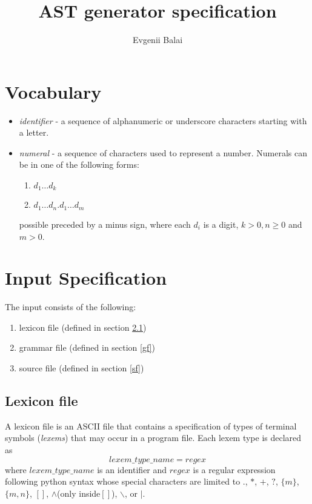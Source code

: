 \documentclass[a4paper,10pt]{article}
\title{AST generator specification}
\author{Evgenii Balai}
\def\st{\noindent}
\begin{document}
\maketitle
\st

\tableofcontents
\section{Vocabulary}

\begin{itemize}
\item \textit{identifier} -  a sequence of alphanumeric or underscore characters starting with a letter.
\item \textit{numeral} - a sequence of characters used to represent a number. Numerals can be in one of the following forms:
\begin{enumerate}
\item $d_1\ldots d_k$
\item $d_1\ldots d_n.d_1\ldots d_m$
\end{enumerate}
possible preceded by a minus sign,
where each $d_i$ is a digit, $k > 0, n\ge 0$ and $m >0$.
\end{itemize}


\section{Input Specification}
The input consists of the following:
\begin{enumerate}
\item lexicon file (defined in section \ref{lf})
\item grammar file (defined in section \ref{gf}) 
\item source file (defined in section \ref{sf})
\end{enumerate}

\subsection{Lexicon file}\label{lf}

A lexicon file is an ASCII file that contains a specification of types of terminal symbols (\textit{lexems}) that may occur in a program file.
Each lexem type is declared as 
\begin{equation}\label{lexdef}
lexem\_type\_name = regex
\end{equation}
where $lexem\_type\_name$ is an identifier and $regex$ is a regular expression following python syntax\cite{pythonre} whose special characters are limited to $.$, $*$, $+$, $?$, $\{m\}$, $\{m,n\}$, $[]$, $\wedge$(only inside$[]$), $\backslash$,  or $|$.
\end{document}
